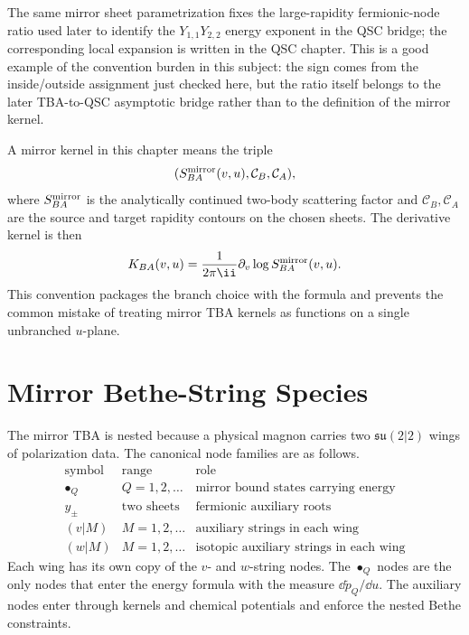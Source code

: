 The same mirror sheet parametrization fixes the large-rapidity fermionic-node
ratio used later to identify the \(Y_{1,1}Y_{2,2}\) energy exponent in the QSC
bridge; the corresponding local expansion is written in the QSC chapter.  This
is a good example of the convention burden in this subject: the sign comes
from the inside/outside assignment just checked here, but the ratio itself
belongs to the later TBA-to-QSC asymptotic bridge rather than to the definition
of the mirror kernel.

\begin{definition}
\label{def:planar-n4-mirror-kernel-datum}
A mirror kernel in this chapter means the triple
\[
  (S^{\rm mirror}_{BA}(v,u),\mathcal C_B,\mathcal C_A),
\]
where \(S^{\rm mirror}_{BA}\) is the analytically continued two-body
scattering factor and \(\mathcal C_B,\mathcal C_A\) are the source and target
rapidity contours on the chosen sheets.  The derivative kernel is then
\[
  K_{BA}(v,u)
  =
  \frac{1}{2\pi\ii}\partial_v\log S^{\rm mirror}_{BA}(v,u).
  \]
This convention packages the branch choice with the formula and prevents
the common mistake of treating mirror TBA kernels as functions on a single
unbranched \(u\)-plane.
\end{definition}

\section{Mirror Bethe-String Species}

The mirror TBA is nested because a physical magnon carries two
\(\mathfrak{su}(2|2)\) wings of polarization data.  The canonical node
families are as follows.
\[
\begin{array}{c|c|c}
\text{symbol} & \text{range} & \text{role}\\
\hline
\bullet_Q & Q=1,2,\ldots & \text{mirror bound states carrying energy}\\
y_\pm & \text{two sheets} & \text{fermionic auxiliary roots}\\
(v|M) & M=1,2,\ldots & \text{auxiliary strings in each wing}\\
(w|M) & M=1,2,\ldots & \text{isotopic auxiliary strings in each wing}
\end{array}
\]
Each wing has its own copy of the \(v\)- and \(w\)-string nodes.  The
\(\bullet_Q\) nodes are the only nodes that enter the energy formula with the
measure \(\dd\widetilde p_Q/\dd u\).  The auxiliary nodes enter through
kernels and chemical potentials and enforce the nested Bethe constraints.

